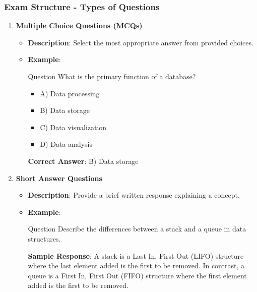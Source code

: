 \documentclass[aspectratio=169]{beamer}
\begin{document}
\begin{frame}[fragile]
    \frametitle{Exam Structure - Types of Questions}
    \begin{enumerate}
        \item \textbf{Multiple Choice Questions (MCQs)}
        \begin{itemize}
            \item \textbf{Description}: Select the most appropriate answer from provided choices.
            \item \textbf{Example}:
            \begin{block}{Question}
                What is the primary function of a database?
                \begin{itemize}
                    \item A) Data processing
                    \item B) Data storage
                    \item C) Data visualization
                    \item D) Data analysis
                \end{itemize}
            \end{block}
            \textbf{Correct Answer}: B) Data storage
        \end{itemize}

        \item \textbf{Short Answer Questions}
        \begin{itemize}
            \item \textbf{Description}: Provide a brief written response explaining a concept.
            \item \textbf{Example}:
            \begin{block}{Question}
                Describe the differences between a stack and a queue in data structures.
            \end{block}
            \textbf{Sample Response}: A stack is a Last In, First Out (LIFO) structure where the last element added is the first to be removed. In contrast, a queue is a First In, First Out (FIFO) structure where the first element added is the first to be removed.
        \end{itemize}


\end{enumerate}
\end{frame}
\end{document}

